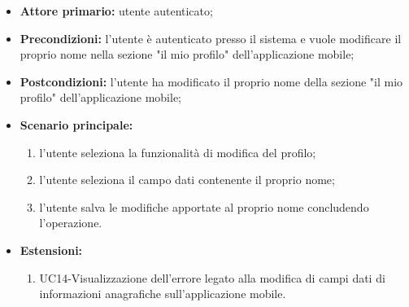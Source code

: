 \begin{itemize}

	\item \textbf{Attore primario:} utente autenticato;

	\item \textbf{Precondizioni:} l'utente è autenticato presso il sistema e vuole modificare il proprio nome nella sezione "il mio profilo" dell'applicazione mobile;

	\item \textbf{Postcondizioni:} l'utente ha modificato il proprio nome della sezione "il mio profilo" dell'applicazione mobile;

	\item \textbf{Scenario principale:}
	
		\begin{enumerate}
   		 	\item l'utente seleziona la funzionalità di modifica del profilo;
   		 	\item l'utente seleziona il campo dati contenente il proprio nome;
   		 	\item l'utente salva le modifiche apportate al proprio nome concludendo l'operazione.
		\end{enumerate}
		
	\item \textbf{Estensioni:}
		\begin{enumerate}
    		\item UC14-Visualizzazione dell'errore legato alla modifica di campi dati di informazioni anagrafiche sull'applicazione mobile.
		\end{enumerate}
		
\end{itemize}


